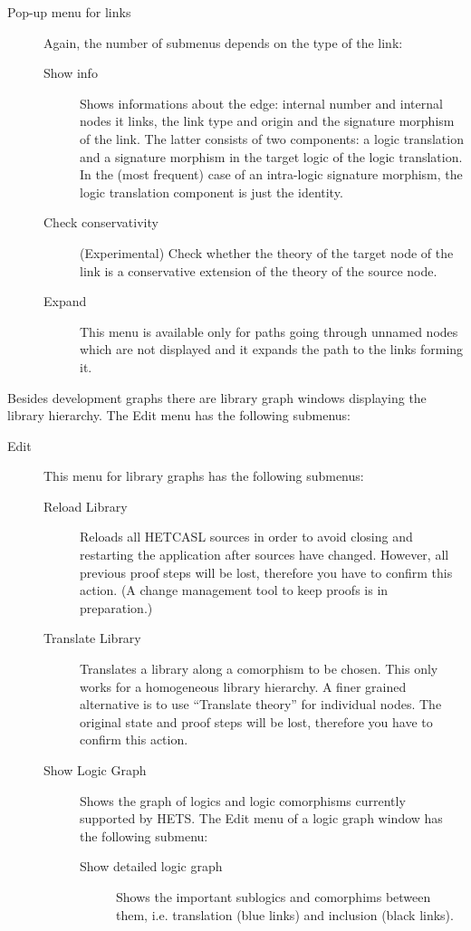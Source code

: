 \documentclass{article}
\newcommand{\normalTEXTSC}[2]{{#1\scriptsize#2}}
\newcommand     {\Hets}{\normalTEXTSC{H}{ETS}\xspace}
\newcommand{\HetCASL}{\normalTEXTSC{H}{ET}\normalTEXTSC{C}{ASL}\xspace}
\begin{document}
\begin{description}
\item[Pop-up menu for links]
Again, the number of submenus depends on the type of the link:
\begin{description}
\item[Show info] Shows informations about the edge: internal number and
internal nodes it links, the link type and origin and the
signature morphism of the link. The latter consists
of two components: a logic translation and a signature morphism in the
target logic of the logic translation.
In the (most frequent) case
of an intra-logic signature morphism, the logic translation component is
just the identity.
\item[Check conservativity] (Experimental) Check whether the
theory of the target node of the link
is a conservative extension of the theory of the source node.
\item[Expand]This menu is available only for paths going through unnamed
nodes which are not displayed and it expands the path to the links forming it.
\end{description}
\end{description}

Besides development graphs there are library graph windows displaying the
library hierarchy. The Edit menu has the following submenus:

\begin{description}
\item[Edit] This menu for library graphs has the following submenus:
\begin{description}
\item[Reload Library] Reloads all \HetCASL sources in order to avoid closing
  and restarting the application after sources have changed. However, all
  previous proof steps will be lost, therefore you have to confirm this
  action. (A change management tool to keep proofs is in preparation.)
\item[Translate Library] Translates a library along a comorphism to be chosen.
  This only works for a homogeneous library hierarchy. A finer grained
  alternative is to use ``Translate theory'' for individual nodes. The
  original state and proof steps will be lost, therefore you have to confirm
  this action.
\item[Show Logic Graph] Shows the graph of logics and logic comorphisms
  currently supported by \Hets. The Edit menu of a logic graph window has the
  following submenu:
\begin{description}
\item[Show detailed logic graph] Shows the important sublogics and comorphims
  between them, i.e. translation (blue links) and inclusion (black links).
\end{description}
\end{description}
\end{description}
\end{document}
